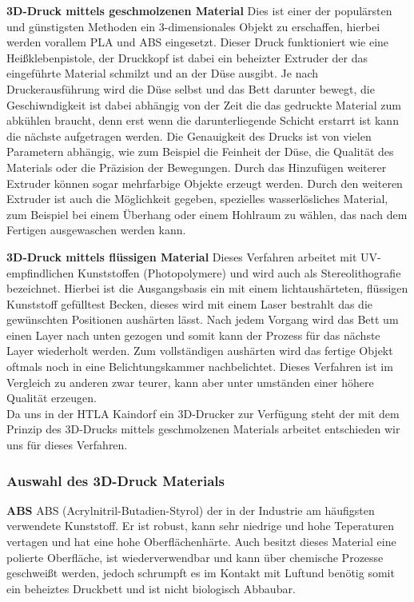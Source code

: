 \textbf{3D-Druck mittels geschmolzenen Material}
Dies ist einer der populärsten und günstigsten Methoden ein 3-dimensionales Objekt zu erschaffen, hierbei werden vorallem PLA und
ABS eingesetzt. Dieser Druck funktioniert wie eine Heißklebenpistole, der Druckkopf ist dabei ein beheizter Extruder der
das eingeführte Material schmilzt und an der Düse ausgibt. Je nach Druckerausführung wird die Düse selbst und das Bett
darunter bewegt, die Geschiwndigkeit ist dabei abhängig von der Zeit die das gedruckte Material zum abkühlen braucht,
denn erst wenn die darunterliegende Schicht erstarrt ist kann die nächste aufgetragen werden. Die Genauigkeit des Drucks
ist von vielen Parametern abhängig, wie zum Beispiel die Feinheit der Düse, die Qualität des Materials oder die Präzision
der Bewegungen. Durch das Hinzufügen weiterer Extruder können sogar mehrfarbige Objekte erzeugt werden. Durch den
weiteren Extruder ist auch die Möglichkeit gegeben, spezielles wasserlösliches Material, zum Beispiel bei einem Überhang
oder einem Hohlraum zu wählen, das nach dem Fertigen ausgewaschen werden kann.

\textbf{3D-Druck mittels flüssigen Material}
Dieses Verfahren arbeitet mit UV-empfindlichen Kunststoffen (Photopolymere) und wird auch als Stereolithografie bezeichnet.
Hierbei ist die Ausgangsbasis ein mit einem lichtaushärteten, flüssigen Kunststoff gefülltest Becken, dieses wird mit
einem Laser bestrahlt das die gewünschten Positionen aushärten lässt. Nach jedem Vorgang wird das Bett um einen Layer nach
unten gezogen und somit kann der Prozess für das nächste Layer wiederholt werden. Zum vollständigen aushärten wird
das fertige Objekt oftmals noch in eine Belichtungskammer nachbelichtet. Dieses Verfahren ist im Vergleich zu anderen
zwar teurer, kann aber unter umständen einer höhere Qualität erzeugen. \\

Da uns in der HTLA Kaindorf ein 3D-Drucker zur Verfügung steht der mit dem Prinzip des 3D-Drucks mittels geschmolzenen Materials
arbeitet entschieden wir uns für dieses Verfahren.

\subsubsection{Auswahl des 3D-Druck Materials}

\textbf{ABS}
ABS (Acrylnitril-Butadien-Styrol) der in der Industrie am häufigsten verwendete Kunststoff. Er ist robust, kann sehr
niedrige und hohe Teperaturen vertagen und hat eine hohe Oberflächenhärte. Auch besitzt dieses Material eine polierte Oberfläche,
ist wiederverwendbar und kann über chemische Prozesse geschweißt werden, jedoch schrumpft es im Kontakt mit Luftund benötig somit ein beheiztes Druckbett und ist
nicht biologisch Abbaubar.

